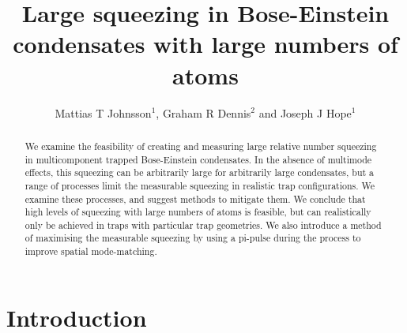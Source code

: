 \documentclass{iopart}
\begin{document}
\title{Large squeezing in Bose-Einstein condensates with large numbers of atoms}

\author{Mattias T Johnsson$^1$, Graham R Dennis$^2$ and Joseph J Hope$^1$}

\address{$^1$Department of Quantum Science, Research School of Physics and Engineering, The Australian National University, Canberra ACT 0200, Australia}
\address{$^2$Plasma Research Laboratory, Research School of Physics and Engineering, The Australian National University, Canberra ACT 0200, Australia}

\begin{abstract}
We examine the feasibility of creating and measuring large relative number squeezing in multicomponent trapped Bose-Einstein condensates.  In the absence of multimode effects, this squeezing can be arbitrarily large for arbitrarily large condensates, but a range of processes limit the measurable squeezing in realistic trap configurations.  We examine these processes, and suggest methods to mitigate them. We conclude that high levels of squeezing with large numbers of atoms is feasible, but can realistically only be achieved in traps with particular trap geometries.  We also introduce a method of maximising the measurable squeezing by using a pi-pulse during the process to improve spatial mode-matching.
\end{abstract}

\maketitle

\section{Introduction}
\label{sectionIntroduction}
\end{document}
